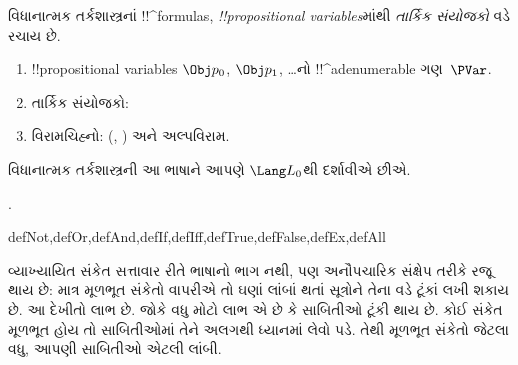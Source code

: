 \documentclass[../../../include/open-logic-section]{subfiles}
\begin{document}


વિધાનાત્મક તર્કશાસ્ત્રનાં !!^{formula}s,
\emph{!!{propositional
    variable}s}માંથી \emph{તાર્કિક સંયોજકો} વડે
રચાય છે.

\begin{enumerate}
\item !!{propositional variable}s $\Obj p_0$, $\Obj p_1$, \dots નો
  !!^a{denumerable} ગણ~$\PVar$.
\item તાર્કિક સંયોજકો:
  \startycommalist
\item વિરામચિહ્નો: (, ) અને અલ્પવિરામ.
\end{enumerate}

વિધાનાત્મક તર્કશાસ્ત્રની આ ભાષાને આપણે $\Lang L_0$થી દર્શાવીએ છીએ.

.

\begin{tagblock}{defNot,defOr,defAnd,defIf,defIff,defTrue,defFalse,defEx,defAll}
\begin{explain}
વ્યાખ્યાયિત સંકેત સત્તાવાર રીતે ભાષાનો ભાગ નથી, પણ અનૌપચારિક
સંક્ષેપ તરીકે રજૂ થાય છે: માત્ર મૂળભૂત સંકેતો વાપરીએ તો ઘણાં લાંબાં
થતાં સૂત્રોને તેના વડે ટૂંકાં લખી શકાય છે. આ દેખીતો લાભ છે. જોકે વધુ
મોટો લાભ એ છે કે સાબિતીઓ ટૂંકી થાય છે. કોઈ સંકેત મૂળભૂત હોય તો
સાબિતીઓમાં તેને અલગથી ધ્યાનમાં લેવો પડે. તેથી મૂળભૂત સંકેતો જેટલા
વધુ, આપણી સાબિતીઓ એટલી લાંબી.
\end{explain}
\end{tagblock}
\end{document}
